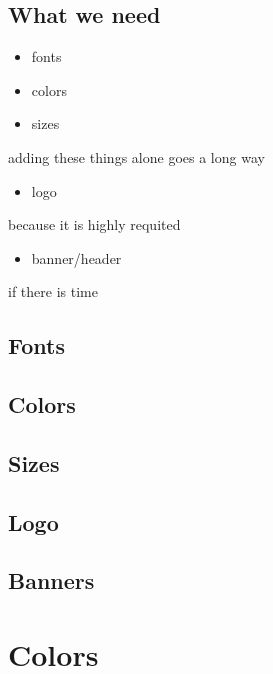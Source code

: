 \documentclass[
  letterpaper,
  DIV=11,
  numbers=noendperiod]{scrreprt}
\providecommand{\tightlist}{%
  \setlength{\itemsep}{0pt}\setlength{\parskip}{0pt}}\usepackage{longtable,booktabs,array}
\begin{document}
\section{What we need}\label{what-we-need}

\begin{itemize}
\tightlist
\item
  fonts
\item
  colors
\item
  sizes
\end{itemize}

adding these things alone goes a long way

\begin{itemize}
\tightlist
\item
  logo
\end{itemize}

because it is highly requited

\begin{itemize}
\tightlist
\item
  banner/header
\end{itemize}

if there is time

\section{Fonts}\label{fonts}

\section{Colors}\label{colors}

\section{Sizes}\label{sizes}

\section{Logo}\label{logo}

\section{Banners}\label{banners}

\chapter{Colors}\label{colors-1}
\end{document}
